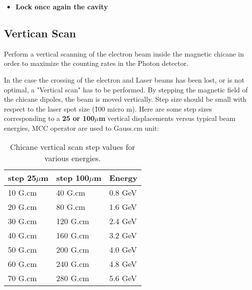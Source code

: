 {\begin{itemize}
        This procedure is only performed by MCC operators.\\

        First of all,
        the Hall A Run Coordinator must request that
        MCC tune the beam through the Compton chicane.
        MCC operators have to apply the section 2 of
        the procedure MCC-PR-04-001. If necessary
       (after a long shutdown for exemple), let's remind to the operator
       to open valves located on the Compton line.
       The complete procedure is available on the MCC web site \\
\href{http://opsntsrv.acc.jlab.org/ops_docs/online_document_files/MCC_online_files/HallA_beam_delivery_proc.pdf}%
{ at this URL}
       
\item {\bf Lock once again the cavity}\\
\end{itemize}

\subsection{Vertican Scan}
Perform a vertical scanning of the electron beam inside the magnetic chicane 
in order to maximize the counting rates in the Photon detector.

        In the case the crossing of the electron and Laser beams
        has been lost, or is not optimal, a "Vertical scan" has to be performed.
        By stepping the magnetic field of the
        chicane dipoles, the beam is moved vertically. Step size should be
        small with respect to the laser spot size (\~100 micro m). Here are some
        step sizes corresponding to a {\bf 25 or 100$\mu$m  } vertical displacements versus
        typical beam energies, MCC operator are used to Gauss.cm unit:
\begin{table}[ht]
\begin{center}
\begin{tabular}{|l|l|l|} \hline
step 25$\mu$m & step 100$\mu$m & Energy \\ \hline\hline
10 G.cm & 40 G.cm & 0.8 GeV \\ \hline
20 G.cm &  80 G.cm &  1.6 GeV \\ \hline
30 G.cm &  120 G.cm & 2.4  GeV \\ \hline
40 G.cm &  160 G.cm & 3.2  GeV \\ \hline
50 G.cm &  200 G.cm & 4.0  GeV \\ \hline
60 G.cm &  240 G.cm &  4.8 GeV \\ \hline
70 G.cm &  280 G.cm &  5.6 GeV \\ \hline 
\end{tabular}
\end{center}
\caption[Compton:vertical scan]{Chicane vertical scan step values for various energies.
}
\label{tab:compton_vscan}
\end{table}
	
}
